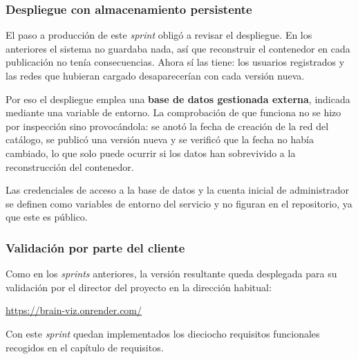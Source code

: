 \subsubsection*{Despliegue con almacenamiento persistente}

El paso a producción de este \textit{sprint} obligó a revisar el despliegue. En los anteriores el
sistema no guardaba nada, así que reconstruir el contenedor en cada publicación no tenía
consecuencias. Ahora sí las tiene: los usuarios registrados y las redes que hubieran cargado
desaparecerían con cada versión nueva.

Por eso el despliegue emplea una \textbf{base de datos gestionada externa}, indicada mediante una
variable de entorno. La comprobación de que funciona no se hizo por inspección sino provocándola:
se anotó la fecha de creación de la red del catálogo, se publicó una versión nueva y se verificó que
la fecha no había cambiado, lo que solo puede ocurrir si los datos han sobrevivido a la
reconstrucción del contenedor.

Las credenciales de acceso a la base de datos y la cuenta inicial de administrador se definen como
variables de entorno del servicio y no figuran en el repositorio, ya que este es público.

\subsubsection*{Validación por parte del cliente}

Como en los \textit{sprints} anteriores, la versión resultante queda desplegada para su validación
por el director del proyecto en la dirección habitual:

\begin{center}
	\url{https://brain-viz.onrender.com/}
\end{center}

Con este \textit{sprint} quedan implementados los dieciocho requisitos funcionales recogidos en el
capítulo de requisitos.

